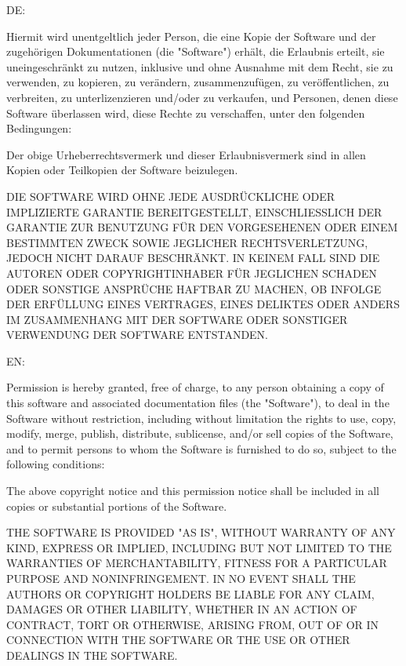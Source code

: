 \documentclass[]{article}
\begin{document}
DE:

Hiermit wird unentgeltlich jeder Person, die eine Kopie der Software und
der zugehörigen Dokumentationen (die "Software") erhält, die Erlaubnis
erteilt, sie uneingeschränkt zu nutzen, inklusive und ohne Ausnahme mit
dem Recht, sie zu verwenden, zu kopieren, zu verändern, zusammenzufügen,
zu veröffentlichen, zu verbreiten, zu unterlizenzieren und/oder zu
verkaufen, und Personen, denen diese Software überlassen wird, diese
Rechte zu verschaffen, unter den folgenden Bedingungen:

Der obige Urheberrechtsvermerk und dieser Erlaubnisvermerk sind in allen
Kopien oder Teilkopien der Software beizulegen.

DIE SOFTWARE WIRD OHNE JEDE AUSDRÜCKLICHE ODER IMPLIZIERTE GARANTIE
BEREITGESTELLT, EINSCHLIESSLICH DER GARANTIE ZUR BENUTZUNG FÜR DEN
VORGESEHENEN ODER EINEM BESTIMMTEN ZWECK SOWIE JEGLICHER
RECHTSVERLETZUNG, JEDOCH NICHT DARAUF BESCHRÄNKT. IN KEINEM FALL SIND
DIE AUTOREN ODER COPYRIGHTINHABER FÜR JEGLICHEN SCHADEN ODER SONSTIGE
ANSPRÜCHE HAFTBAR ZU MACHEN, OB INFOLGE DER ERFÜLLUNG EINES VERTRAGES,
EINES DELIKTES ODER ANDERS IM ZUSAMMENHANG MIT DER SOFTWARE ODER
SONSTIGER VERWENDUNG DER SOFTWARE ENTSTANDEN.

EN:

Permission is hereby granted, free of charge, to any person obtaining a
copy of this software and associated documentation files (the
"Software"), to deal in the Software without restriction, including
without limitation the rights to use, copy, modify, merge, publish,
distribute, sublicense, and/or sell copies of the Software, and to
permit persons to whom the Software is furnished to do so, subject to
the following conditions:

The above copyright notice and this permission notice shall be included
in all copies or substantial portions of the Software.

THE SOFTWARE IS PROVIDED "AS IS", WITHOUT WARRANTY OF ANY KIND, EXPRESS
OR IMPLIED, INCLUDING BUT NOT LIMITED TO THE WARRANTIES OF
MERCHANTABILITY, FITNESS FOR A PARTICULAR PURPOSE AND NONINFRINGEMENT.
IN NO EVENT SHALL THE AUTHORS OR COPYRIGHT HOLDERS BE LIABLE FOR ANY
CLAIM, DAMAGES OR OTHER LIABILITY, WHETHER IN AN ACTION OF CONTRACT,
TORT OR OTHERWISE, ARISING FROM, OUT OF OR IN CONNECTION WITH THE
SOFTWARE OR THE USE OR OTHER DEALINGS IN THE SOFTWARE.
\end{document}
